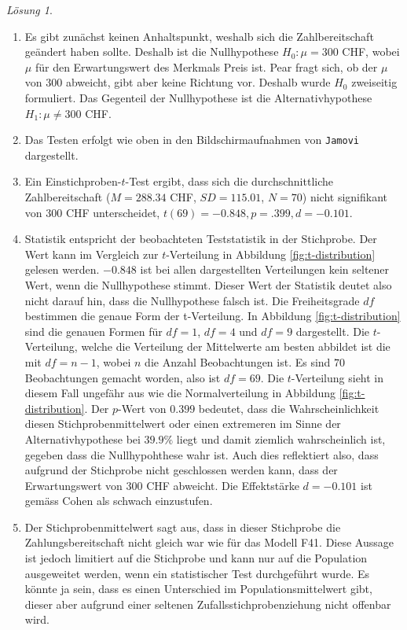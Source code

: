 \documentclass[
]{book}
\providecommand{\tightlist}{%
  \setlength{\itemsep}{0pt}\setlength{\parskip}{0pt}}
\theoremstyle{definition}
\theoremstyle{definition}
\theoremstyle{definition}
\theoremstyle{definition}
\theoremstyle{remark}
\newtheorem*{solution}{Lösung}
\begin{document}
\begin{solution}
\begin{enumerate}
\def\labelenumi{\alph{enumi})}
\tightlist
\item
  Es gibt zunächst keinen Anhaltspunkt, weshalb sich die Zahlbereitschaft geändert haben sollte. Deshalb ist die Nullhypothese \(H_0: \mu = 300\) CHF, wobei \(\mu\) für den Erwartungswert des Merkmals Preis ist. Pear fragt sich, ob der \(\mu\) von \(300\) abweicht, gibt aber keine Richtung vor. Deshalb wurde \(H_0\) zweiseitig formuliert. Das Gegenteil der Nullhypothese ist die Alternativhypothese \(H_1: \mu \neq 300\) CHF.
\item
  Das Testen erfolgt wie oben in den Bildschirmaufnahmen von \texttt{Jamovi} dargestellt.
\item
  Ein Einstichproben-\(t\)-Test ergibt, dass sich die durchschnittliche Zahlbereitschaft (\(M=288.34\) CHF, \(SD = 115.01\), \(N = 70\)) nicht signifikant von \(300\) CHF unterscheidet, \(t(69)= -0.848, p = .399, d = -0.101\).
\item
  Statistik entspricht der beobachteten Teststatistik in der Stichprobe. Der Wert kann im Vergleich zur \(t\)-Verteilung in Abbildung \ref{fig:t-distribution} gelesen werden. \(-0.848\) ist bei allen dargestellten Verteilungen kein seltener Wert, wenn die Nullhypothese stimmt. Dieser Wert der Statistik deutet also nicht darauf hin, dass die Nullhypothese falsch ist. Die Freiheitsgrade \(df\) bestimmen die genaue Form der t-Verteilung. In Abbildung \ref{fig:t-distribution} sind die genauen Formen für \(df = 1\), \(df = 4\) und \(df = 9\) dargestellt. Die \(t\)-Verteilung, welche die Verteilung der Mittelwerte am besten abbildet ist die mit \(df = n-1\), wobei \(n\) die Anzahl Beobachtungen ist. Es sind \(70\) Beobachtungen gemacht worden, also ist \(df = 69\). Die \(t\)-Verteilung sieht in diesem Fall ungefähr aus wie die Normalverteilung in Abbildung \ref{fig:t-distribution}. Der \(p\)-Wert von \(0.399\) bedeutet, dass die Wahrscheinlichkeit diesen Stichprobenmittelwert oder einen extremeren im Sinne der Alternativhypothese bei \(39.9\%\) liegt und damit ziemlich wahrscheinlich ist, gegeben dass die Nullhypohthese wahr ist. Auch dies reflektiert also, dass aufgrund der Stichprobe nicht geschlossen werden kann, dass der Erwartungswert von \(300\) CHF abweicht. Die Effektstärke \(d= -0.101\) ist gemäss Cohen als schwach einzustufen.
\item
  Der Stichprobenmittelwert sagt aus, dass in dieser Stichprobe die Zahlungsbereitschaft nicht gleich war wie für das Modell F41. Diese Aussage ist jedoch limitiert auf die Stichprobe und kann nur auf die Population ausgeweitet werden, wenn ein statistischer Test durchgeführt wurde. Es könnte ja sein, dass es einen Unterschied im Populationsmittelwert gibt, dieser aber aufgrund einer seltenen Zufallsstichprobenziehung nicht offenbar wird.
\end{enumerate}

\end{solution}
\end{document}
